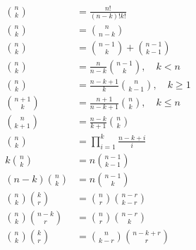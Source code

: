 \begin{align*}
\binom{n}{k} &= \frac{n!}{(n-k)!k!}\\
\binom{n}{k} &= \binom{n}{n-k}\\
\binom{n}{k} &= \binom{n-1}{k}+\binom{n-1}{k-1}\\
\binom{n}{k} &= \frac{n}{n-k}\binom{n-1}{k},\quad k<n\\
\binom{n}{k} &= \frac{n-k+1}{k}\binom{n}{k-1},\quad k\ge1\\
\binom{n+1}{k} &= \frac{n+1}{n-k+1}\binom{n}{k},\quad k\le n\\
\binom{n}{k+1} &= \frac{n-k}{k+1}\binom{n}{k}\\
\binom{n}{k} &= \prod_{i=1}^{k}\frac{n-k+i}{i}\\
k\binom{n}{k} &= n\binom{n-1}{k-1}\\
(n-k)\binom{n}{k} &= n\binom{n-1}{k}\\
\binom{n}{k}\binom{k}{r}
&= \binom{n}{r}\binom{n-r}{k-r}\\
\binom{n}{k}\binom{n-k}{r}
&= \binom{n}{r}\binom{n-r}{k}\\
\binom{n}{k}\binom{k}{r}
&= \binom{n}{k-r}\binom{n-k+r}{r}
\end{align*}

